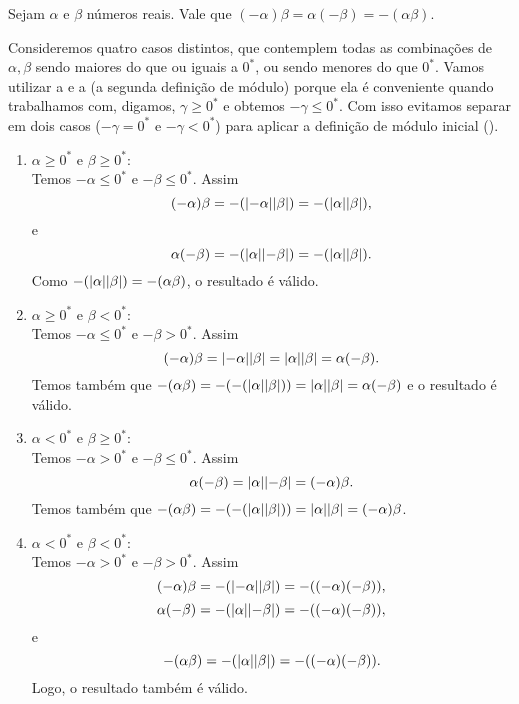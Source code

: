 \documentclass[../main.tex]{subfiles}
\begin{document}
\begin{prop}\label{reais-teo-regraSinaisProduto1}
    Sejam $\alpha$ e $\beta$ números reais. Vale que $\left( - \alpha \right) \beta = \alpha \left( -\beta \right) = -\left(\alpha \beta \right) $.
\end{prop}
\begin{dem}
    Consideremos quatro casos distintos, que contemplem todas as combinações de $\alpha, \beta$ sendo maiores do que ou iguais a $0^*$, ou sendo menores do que $0^*$. Vamos utilizar a  e a  (a segunda definição de módulo) porque ela  é conveniente quando trabalhamos com, digamos, $\gamma \geq 0^*$ e obtemos $-\gamma \leq 0^*$. Com isso evitamos separar em dois casos ($-\gamma = 0^*$ e $-\gamma < 0^*$) para aplicar a definição de módulo inicial ().
    \begin{enumerate}
        \item $\alpha \geq 0^*$ e $\beta \geq 0^*$: \\
            Temos $-\alpha \leq 0^*$ e $-\beta \leq 0^*$. Assim
            \[ (-\alpha)\beta = -(\abs{-\alpha}\abs{\beta}) = -(\abs{\alpha}\abs{\beta}) ,\]
            e
            \[ \alpha(-\beta) = -(\abs{\alpha}\abs{-\beta}) = -(\abs{\alpha}\abs{\beta}). \]
            Como $-(\abs{\alpha}\abs{\beta}) = -(\alpha\beta)$, o resultado é válido.
        \item $\alpha \geq 0^*$ e $\beta < 0^*$: \\
            Temos $-\alpha \leq 0^*$ e $-\beta > 0^*$. Assim
            \[ (-\alpha)\beta = \abs{-\alpha}\abs{\beta} = \abs{\alpha}\abs{\beta} = \alpha(-\beta). \]
            Temos também que $-(\alpha \beta) = -(- (\abs{\alpha}\abs{\beta} )) = \abs{\alpha}\abs{\beta} = \alpha(-\beta)$ e o resultado é válido.   
        \item $\alpha < 0^*$ e $\beta \geq 0^*$: \\
            Temos $-\alpha > 0^*$ e $-\beta \leq 0^*$. Assim
            \[ \alpha(-\beta) = \abs{\alpha}\abs{-\beta} = (-\alpha)\beta. \]
            Temos também que $-(\alpha \beta) = -(- (\abs{\alpha}\abs{\beta} )) = \abs{\alpha}\abs{\beta} = (-\alpha)\beta$.       
        \item $\alpha < 0^*$ e $\beta < 0^*$: \\
            Temos $-\alpha > 0^*$ e $-\beta > 0^*$. Assim  
            \[ (-\alpha) \beta = -(\abs{-\alpha} \abs{\beta}) = -((-\alpha)(-\beta)), \]
            \[ \alpha (-\beta) = -(\abs{\alpha}  \abs{-\beta}) = -((-\alpha)(-\beta)), \]
            e
            \[ -(\alpha \beta) = -(\abs{\alpha}  \abs{\beta})  = -((-\alpha)(-\beta)).\]
            Logo, o resultado também é válido.
            
                     
    \end{enumerate}
\end{dem}
\end{document}
